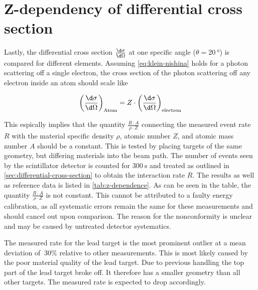 
\section{Z-dependency of differential cross section}
\label{sec:z-dependence}

Lastly, the differential cross section $\frac{\d\sigma}{\d\Omega}$ at one specific
angle ($\theta = \SI{20}{\degree}$) is compared for different elements. Assuming
\autoref{eq:klein-nishina} holds for a photon scattering off a single electron, the
cross section of the photon scattering off any electron inside an atom should scale
like

\begin{equation}
\label{eq:z-dependence}
\left( \frac{\d\sigma}{\d\Omega} \right)_\text{Atom} = Z\cdot\left( \frac{\d\sigma}{\d\Omega} \right)_\text{electron}
\end{equation}

This espically implies that the quantity $\frac{R\cdot A}{\rho\cdot Z}$ connecting
the measured event rate $R$ with the material specific density $\rho$, atomic number
$Z$, and atomic mass number $A$ should be a constant. This is tested by placing
targets of the same geometry, but differing materials into the beam path. The number
of events seen by the scintillator detector is counted for $\SI{300}{\second}$ and
treated as outlined in \autoref{sec:differential-cross-section} to obtain the 
interaction rate $R$. The results as well as reference data is listed in 
\autoref{tab:z-dependence}. As can be seen in the table, the quantity 
$\frac{R\cdot A}{\rho\cdot Z}$ is not constant. This cannot be attributed to a faulty 
energy calibration, as all systematic errors remain the same for these measurements 
and should cancel out upon comparison. The reason for the nonconformity is unclear 
and may be caused by untreated detector systematics.

The measured rate for the lead target is the most prominent outlier at a mean 
deviation of $~30\%$ relative to other measurements. This is most likely caused by 
the poor material quality of the lead target. Due to previous handling the top part 
of the lead target broke off. It therefore has a smaller geometry than all other 
targets. The measured rate is expected to drop accordingly.


